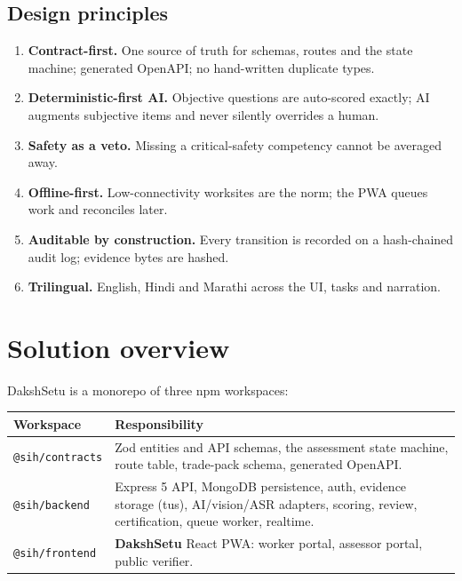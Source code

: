 \documentclass[11pt,a4paper]{article}
\newcommand{\code}[1]{\texttt{\small #1}}
\begin{document}
\subsection{Design principles}
\begin{enumerate}
\item \textbf{Contract-first.} One source of truth for schemas, routes and
      the state machine; generated OpenAPI; no hand-written duplicate types.
\item \textbf{Deterministic-first AI.} Objective questions are auto-scored
      exactly; AI augments subjective items and never silently overrides a
      human.
\item \textbf{Safety as a veto.} Missing a critical-safety competency cannot
      be averaged away.
\item \textbf{Offline-first.} Low-connectivity worksites are the norm; the
      PWA queues work and reconciles later.
\item \textbf{Auditable by construction.} Every transition is recorded on a
      hash-chained audit log; evidence bytes are hashed.
\item \textbf{Trilingual.} English, Hindi and Marathi across the UI, tasks
      and narration.
\end{enumerate}

\section{Solution overview}
DakshSetu is a monorepo of three npm workspaces:

\begin{center}
\begin{tabular}{L{3.4cm}L{12.2cm}}
\toprule
\textbf{Workspace} & \textbf{Responsibility} \\
\midrule
\code{@sih/contracts} & Zod entities and API schemas, the assessment state
machine, route table, trade-pack schema, generated OpenAPI. \\[2pt]
\code{@sih/backend} & Express 5 API, MongoDB persistence, auth, evidence
storage (tus), AI/vision/ASR adapters, scoring, review, certification,
queue worker, realtime. \\[2pt]
\code{@sih/frontend} & \textbf{DakshSetu} React PWA: worker portal, assessor
portal, public verifier. \\
\bottomrule
\end{tabular}
\end{center}
\end{document}
